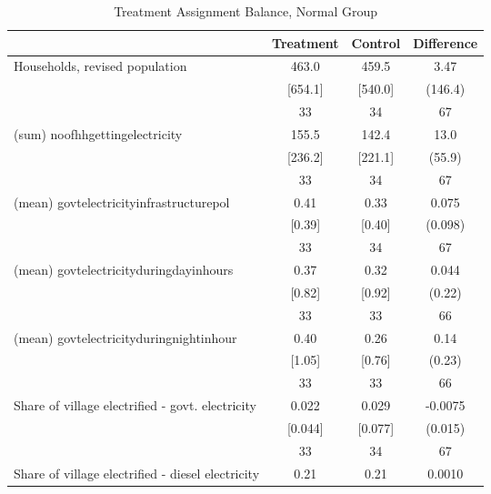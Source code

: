 \begin{table}[htbp]\centering
\def\sym#1{\ifmmode^{#1}\else\(^{#1}\)\fi}
\caption{Treatment Assignment Balance, Normal Group \label{tab:"balance"}}
\begin{tabular*}{0.9\hsize}{@{\hskip\tabcolsep\extracolsep\fill}l*{1}{ccc}}
\toprule
                                &Treatment&  Control&Difference         \\
\midrule
Households, revised population  &    463.0&    459.5&     3.47         \\
                                &  [654.1]&  [540.0]&  (146.4)         \\
                                &       33&       34&       67         \\
(sum) noofhhgettingelectricity  &    155.5&    142.4&     13.0         \\
                                &  [236.2]&  [221.1]&   (55.9)         \\
                                &       33&       34&       67         \\
(mean) govtelectricityinfrastructurepol&     0.41&     0.33&    0.075         \\
                                &   [0.39]&   [0.40]&  (0.098)         \\
                                &       33&       34&       67         \\
(mean) govtelectricityduringdayinhours&     0.37&     0.32&    0.044         \\
                                &   [0.82]&   [0.92]&   (0.22)         \\
                                &       33&       33&       66         \\
(mean) govtelectricityduringnightinhour&     0.40&     0.26&     0.14         \\
                                &   [1.05]&   [0.76]&   (0.23)         \\
                                &       33&       33&       66         \\
Share of village electrified - govt. electricity&    0.022&    0.029&  -0.0075         \\
                                &  [0.044]&  [0.077]&  (0.015)         \\
                                &       33&       34&       67         \\
Share of village electrified - diesel electricity&     0.21&     0.21&   0.0010         \\

\end{tabular*}
\end{table}
